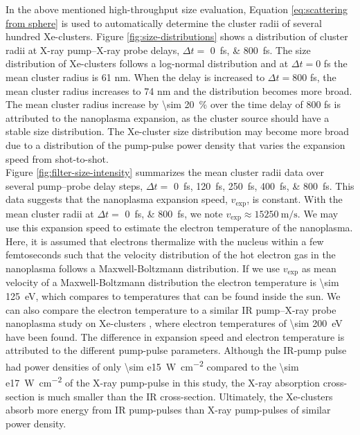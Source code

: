 In the above mentioned high-throughput size evaluation, Equation \eqref{eq:scattering from sphere} is used to automatically determine the cluster radii of several hundred Xe-clusters. Figure \ref{fig:size-distributions} shows a distribution of cluster radii at X-ray pump--X-ray probe delays, $\Delta t =$ \SIlist{0;800}{\femto\second}. The size distribution of Xe-clusters follows a log-normal distribution \citep{Schutte-2002-IJMS} and at $\Delta t=0$ fs the mean cluster radius is 61 nm. When the delay is increased to $\Delta t=800$ fs, the mean cluster radius increases to 74 nm and the distribution becomes more broad. The mean cluster radius increase by \SI{\sim 20}{\percent} over the time delay of 800 fs is attributed to the nanoplasma expansion, as the cluster source should have a stable size distribution. The Xe-cluster size distribution may become more broad due to a distribution of the pump-pulse power density that varies the expansion speed from shot-to-shot.\\[1\baselineskip]
%
Figure \ref{fig:filter-size-intensity} summarizes the mean cluster radii data over several pump--probe delay steps, $\Delta t=$ \SIlist{0;120;250;400;800}{\femto\second}. This data suggests that the nanoplasma expansion speed, $v_{\text{exp}}$, is constant. With the mean cluster radii at $\Delta t=$ \SIlist{0;800}{\femto\second}, we note $v_{\text{exp}}\approx \SI{15250}{\meter\per\second}$. We may use this expansion speed to estimate the electron temperature of the nanoplasma. Here, it is assumed that electrons thermalize with the nucleus within a few femtoseconds such that the velocity distribution of the hot electron gas in the nanoplasma follows a Maxwell-Boltzmann distribution. If we use $v_{\text{exp}}$ as mean velocity of a Maxwell-Boltzmann distribution the electron temperature is \SI{\sim 125}{\electronvolt}, which compares to temperatures that can be found inside the sun. We can also compare the electron temperature to a similar IR pump--X-ray probe nanoplasma study on Xe-clusters \citep{Gorkhover-2016-NatPho}, where electron temperatures of \SI{\sim 200}{\electronvolt} have been found. The difference in expansion speed and electron temperature is attributed to the different pump-pulse parameters. Although the IR-pump pulse had power densities of only \SI{\sim e15}{\watt\per\square\centi\meter} compared to the \SI{\sim e17}{\watt\per\square\centi\meter} of the X-ray pump-pulse in this study, the X-ray absorption cross-section is much smaller than the IR cross-section. Ultimately, the Xe-clusters absorb more energy from IR pump-pulses than X-ray pump-pulses of similar power density.\\[1\baselineskip]
